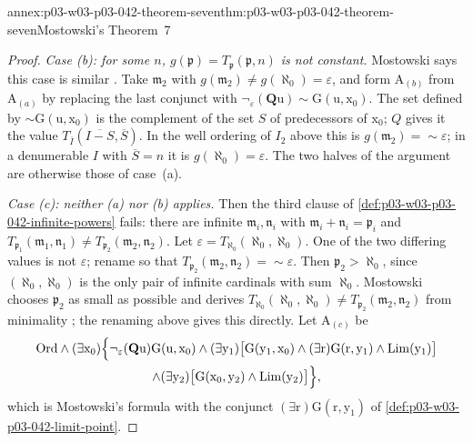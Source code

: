\begin{annexitem}{annex:p03-w03-p03-042-theorem-seven}{thm:p03-w03-p03-042-theorem-seven}{Mostowski's Theorem~7}
\begin{proof}
\emph{Case (b): for some \(n\), \(g(\mathfrak p)=T_{\mathfrak p}(\mathfrak
p,n)\) is not constant.}  Mostowski says this case is similar
\cite[p.~25]{Mostowski1957}.  Take \(\mathfrak m_2\) with \(g(\mathfrak
m_2)\neq g(\aleph_0)=\varepsilon\), and form \(\mathrm A_{(b)}\) from
\(\mathrm A_{(a)}\) by replacing the last conjunct with
\(\neg_\varepsilon(\mathbf Q\mathrm u){\sim}\mathrm G(\mathrm u,\mathrm
x_0)\).  The set defined by \({\sim}\mathrm G(\mathrm u,\mathrm x_0)\) is
the complement of the set \(S\) of predecessors of \(\mathrm x_0\); \(Q\)
gives it the value \(T_{\overline I}(\overline{I-S},\overline S)\).  In the
well ordering of \(I_2\) above this is \(g(\mathfrak m_2)={\sim}
\varepsilon\); in a denumerable \(I\) with \(\overline S=n\) it is
\(g(\aleph_0)=\varepsilon\).  The two halves of the argument are otherwise
those of case~(a).

\emph{Case (c): neither (a) nor (b) applies.}  Then the third clause of
\cref{def:p03-w03-p03-042-infinite-powers} fails: there are infinite
\(\mathfrak m_i,\mathfrak n_i\) with \(\mathfrak m_i+\mathfrak n_i=
\mathfrak p_i\) and \(T_{\mathfrak p_1}(\mathfrak m_1,\mathfrak n_1)\neq
T_{\mathfrak p_2}(\mathfrak m_2,\mathfrak n_2)\).  Let \(\varepsilon=
T_{\aleph_0}(\aleph_0,\aleph_0)\).  One of the two differing values is
not \(\varepsilon\); rename so that \(T_{\mathfrak p_2}(\mathfrak m_2,
\mathfrak n_2)={\sim}\varepsilon\).  Then \(\mathfrak p_2>\aleph_0\), since
\((\aleph_0,\aleph_0)\) is the only pair of infinite cardinals with sum
\(\aleph_0\).  Mostowski chooses \(\mathfrak p_2\) as small as possible and
derives \(T_{\aleph_0}(\aleph_0,\aleph_0)\neq T_{\mathfrak p_2}(\mathfrak
m_2,\mathfrak n_2)\) from minimality \cite[p.~25]{Mostowski1957}; the
renaming above gives this directly.  Let \(\mathrm A_{(c)}\) be
\begin{multline*}
\mathrm{Ord}\wedge(\exists\mathrm x_0)\Bigl\{\neg_\varepsilon(\mathbf
Q\mathrm u)\mathrm G(\mathrm u,\mathrm x_0)\wedge(\exists\mathrm y_1)
\bigl[\mathrm G(\mathrm y_1,\mathrm x_0)\wedge(\exists\mathrm r)\mathrm
G(\mathrm r,\mathrm y_1)\wedge\mathrm{Lim}(\mathrm y_1)\bigr]\\
\wedge(\exists\mathrm y_2)\bigl[\mathrm G(\mathrm x_0,\mathrm y_2)\wedge
\mathrm{Lim}(\mathrm y_2)\bigr]\Bigr\},
\end{multline*}
which is Mostowski's formula with the conjunct \((\exists\mathrm r)\mathrm
G(\mathrm r,\mathrm y_1)\) of \cref{def:p03-w03-p03-042-limit-point}.


\end{proof}
\end{annexitem}
